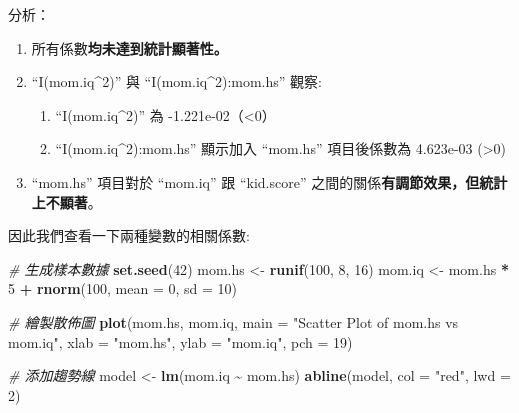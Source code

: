 \documentclass[
]{article}
\newenvironment{Shaded}{\begin{snugshade}}{\end{snugshade}}
\newcommand{\AttributeTok}[1]{\textcolor[rgb]{0.13,0.29,0.53}{#1}}
\newcommand{\CommentTok}[1]{\textcolor[rgb]{0.56,0.35,0.01}{\textit{#1}}}
\newcommand{\DecValTok}[1]{\textcolor[rgb]{0.00,0.00,0.81}{#1}}
\newcommand{\FunctionTok}[1]{\textcolor[rgb]{0.13,0.29,0.53}{\textbf{#1}}}
\newcommand{\NormalTok}[1]{#1}
\newcommand{\OtherTok}[1]{\textcolor[rgb]{0.56,0.35,0.01}{#1}}
\newcommand{\SpecialCharTok}[1]{\textcolor[rgb]{0.81,0.36,0.00}{\textbf{#1}}}
\newcommand{\StringTok}[1]{\textcolor[rgb]{0.31,0.60,0.02}{#1}}
\providecommand{\tightlist}{%
  \setlength{\itemsep}{0pt}\setlength{\parskip}{0pt}}
\begin{document}
分析：

\begin{enumerate}
\def\labelenumi{\arabic{enumi}.}
\tightlist
\item
  所有係數\textbf{均未達到統計顯著性。}
\item
  ``I(mom.iq\^{}2)'' 與 ``I(mom.iq\^{}2):mom.hs'' 觀察:

  \begin{enumerate}
  \def\labelenumii{\arabic{enumii}.}
  \tightlist
  \item
    ``I(mom.iq\^{}2)'' 為 -1.221e-02（\textless0）
  \item
    ``I(mom.iq\^{}2):mom.hs'' 顯示加入 ``mom.hs'' 項目後係數為 4.623e-03
    (\textgreater0)
  \end{enumerate}
\item
  ``mom.hs'' 項目對於 ``mom.iq'' 跟 ``kid.score''
  之間的關係\textbf{有調節效果，但統計上不顯著}。
\end{enumerate}

因此我們查看一下兩種變數的相關係數:

\begin{Shaded}
\begin{Highlighting}[]
\CommentTok{\# 生成樣本數據}
\FunctionTok{set.seed}\NormalTok{(}\DecValTok{42}\NormalTok{)}
\NormalTok{mom.hs }\OtherTok{\textless{}{-}} \FunctionTok{runif}\NormalTok{(}\DecValTok{100}\NormalTok{, }\DecValTok{8}\NormalTok{, }\DecValTok{16}\NormalTok{)}
\NormalTok{mom.iq }\OtherTok{\textless{}{-}}\NormalTok{ mom.hs }\SpecialCharTok{*} \DecValTok{5} \SpecialCharTok{+} \FunctionTok{rnorm}\NormalTok{(}\DecValTok{100}\NormalTok{, }\AttributeTok{mean =} \DecValTok{0}\NormalTok{, }\AttributeTok{sd =} \DecValTok{10}\NormalTok{)}

\CommentTok{\# 繪製散佈圖}
\FunctionTok{plot}\NormalTok{(mom.hs, mom.iq, }\AttributeTok{main =} \StringTok{"Scatter Plot of mom.hs vs mom.iq"}\NormalTok{,}
     \AttributeTok{xlab =} \StringTok{"mom.hs"}\NormalTok{, }\AttributeTok{ylab =} \StringTok{"mom.iq"}\NormalTok{, }\AttributeTok{pch =} \DecValTok{19}\NormalTok{)}

\CommentTok{\# 添加趨勢線}
\NormalTok{model }\OtherTok{\textless{}{-}} \FunctionTok{lm}\NormalTok{(mom.iq }\SpecialCharTok{\textasciitilde{}}\NormalTok{ mom.hs)}
\FunctionTok{abline}\NormalTok{(model, }\AttributeTok{col =} \StringTok{"red"}\NormalTok{, }\AttributeTok{lwd =} \DecValTok{2}\NormalTok{)}
\end{Highlighting}
\end{Shaded}
\end{document}

